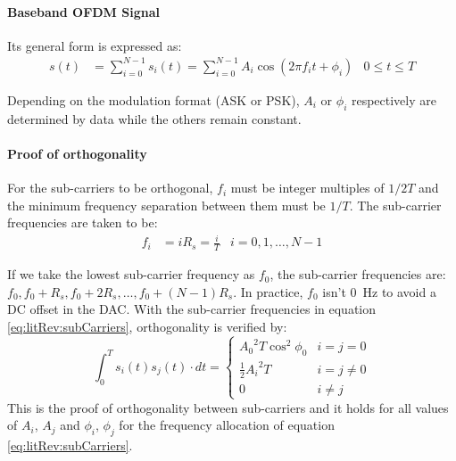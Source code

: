 \paragraph{Baseband OFDM Signal} Its general form is expressed as:
\begin{align}
	s(t) &= \sum_{i=0}^{N-1}s_i(t) = \sum_{i=0}^{N-1}A_i \cos (2\pi f_i t + \phi_i) & 0 \leq t \leq T
\end{align}
\begin{mathDef}
\end{mathDef}
Depending on the modulation format (\gls{ASK} or \gls{PSK}), \(A_i\) or \(\phi_i\) respectively are determined by data while the others remain constant.
\paragraph{Proof of orthogonality} For the sub-carriers to be orthogonal, \(f_i\) must be integer multiples of \(1/2T\) and the minimum frequency separation between them must be \(1/T\). The sub-carrier frequencies are taken to be:
\begin{align}
	f_i &= iR_s = \frac{i}{T} & i = 0, 1, \ldots, N-1
	\label{eq:litRev:subCarriers}
\end{align}
\begin{mathDef}
\end{mathDef}
If we take the lowest sub-carrier frequency as \(f_0\), the sub-carrier frequencies are: \(f_0, f_0 + R_s, f_0 + 2R_s, \ldots, f_0 + (N-1)R_s\). In practice, \(f_0\) isn't \SI{0}{\hertz} to avoid a DC offset in the \gls{DAC}.
With the sub-carrier frequencies in equation \eqref{eq:litRev:subCarriers}, orthogonality is verified by:
\begin{equation}
	\int_0^T s_i(t)s_j(t) \cdot dt =
	\begin{cases}
		{A_0}^2 T\cos^2 \phi_0 & i = j = 0 \\
		\frac{1}{2}{A_i}^2 T & i = j \neq 0 \\
		0 & i \neq j
	\end{cases}
\end{equation}
This is the proof of orthogonality between sub-carriers and it holds for all values of \(A_i\), \(A_j\) and \(\phi_i\), \(\phi_j\) for the frequency allocation of equation \eqref{eq:litRev:subCarriers}\cite{ofdm_intro}.

